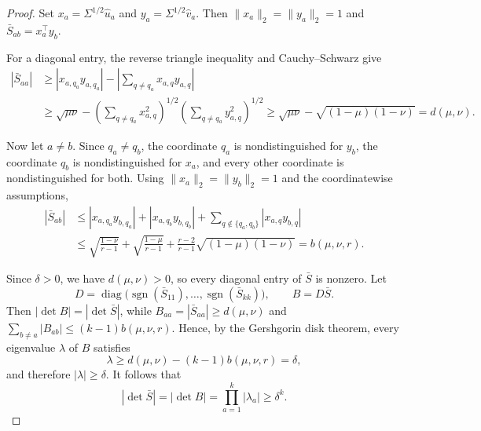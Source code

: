 \documentclass[10pt,a4paper]{amsart}
\begin{document}
\begin{proof}
Set $x_a=\Sigma^{1/2}\widehat u_a$ and
$y_a=\Sigma^{1/2}\widehat v_a$. Then
$\|x_a\|_2=\|y_a\|_2=1$ and
$\bar S_{ab}=x_a^\top y_b$.

For a diagonal entry, the reverse triangle inequality and
Cauchy--Schwarz give
\[
\begin{aligned}
|\bar S_{aa}|
&\geq
|x_{a,q_a}y_{a,q_a}|
-
\left|
\sum_{q\neq q_a}x_{a,q}y_{a,q}
\right| \\
&\geq
\sqrt{\mu\nu}
-
\left(\sum_{q\neq q_a}x_{a,q}^2\right)^{1/2}
\left(\sum_{q\neq q_a}y_{a,q}^2\right)^{1/2} \geq
\sqrt{\mu\nu}
-
\sqrt{(1-\mu)(1-\nu)}
=
d(\mu,\nu).
\end{aligned}
\]

Now let $a\neq b$. Since $q_a\neq q_b$, the coordinate $q_a$ is
nondistinguished for $y_b$, the coordinate $q_b$ is nondistinguished
for $x_a$, and every other coordinate is nondistinguished for both.
Using $\|x_a\|_2=\|y_b\|_2=1$ and the coordinatewise assumptions,
\[
\begin{aligned}
|\bar S_{ab}|
&\leq
|x_{a,q_a}y_{b,q_a}|
+
|x_{a,q_b}y_{b,q_b}|
+
\sum_{q\notin\{q_a,q_b\}}|x_{a,q}y_{b,q}| \\
&\leq
\sqrt{\frac{1-\nu}{r-1}}
+
\sqrt{\frac{1-\mu}{r-1}}
+
\frac{r-2}{r-1}\sqrt{(1-\mu)(1-\nu)} =
b(\mu,\nu,r).
\end{aligned}
\]

Since $\delta>0$, we have $d(\mu,\nu)>0$, so every diagonal entry of
$\bar S$ is nonzero. Let
\[
D=
\operatorname{diag}
\bigl(
\operatorname{sgn}(\bar S_{11}),\ldots,
\operatorname{sgn}(\bar S_{kk})
\bigr),
\qquad
B=D\bar S.
\]
Then $|\det B|=|\det\bar S|$, while
$B_{aa}=|\bar S_{aa}|\geq d(\mu,\nu)$ and
\(
\sum_{b\neq a}|B_{ab}|
\leq
(k-1)b(\mu,\nu,r).
\)
Hence, by the Gershgorin disk theorem, every eigenvalue $\lambda$ of
$B$ satisfies
\[
\lambda
\geq
d(\mu,\nu)-(k-1)b(\mu,\nu,r)
=
\delta,
\]
and therefore $|\lambda|\geq\delta$. It follows that
\[
|\det\bar S|
=
|\det B|
=
\prod_{a=1}^k|\lambda_a|
\geq
\delta^k.
\]
\end{proof}
\end{document}
